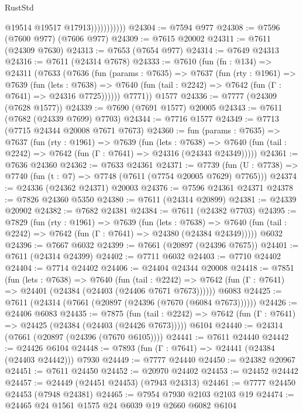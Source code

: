 \begin{lexlean}{RustStd}
\begin{coremodule}
{\begin{coremodule}
{{{{{{{{{{{{{{{{{{{{{{{{{{{{{{{{{{                          @19514
                          @19517
                          @17913)))))))))))
@24304 := @7594 @977
@24308 := @7596 (@7600 @977) (@7606 @977)
@24309 := @7615 @20002
@24311 := @7611 (@24309 @7630)
@24313 := @7653 (@7654 @977)
@24314 := @7649 @24313
@24316 := @7611 (@24314 @7678)
@24333 := @7610
    (fun (fn : @134) =>
    @24311
      (@7633
        (@7636
          (fun (params : @7635) =>
          @7637
            (fun (rty : @1961) =>
            @7639
              (fun (lets : @7638) =>
              @7640 (fun (tail : @2242) => @7642 (fun (Γ : @7641) => @24316 @7725))))))
        @7771))
    @1577
@24336 := @7777 (@24309 (@7628 @1577))
@24339 := @7690 (@7691 @1577) @20005
@24343 := @7611 (@7682 (@24339 @7699) @7703)
@24344 := @7716 @1577
@24349 := @7713 (@7715 @24344 @20008 @7671 @7673)
@24360 := fun (params : @7635) =>
  @7637
    (fun (rty : @1961) =>
    @7639
      (fun (lets : @7638) =>
      @7640 (fun (tail : @2242) => @7642 (fun (Γ : @7641) => @24316 (@24343 @24349)))))
@24361 := @7636 @24360
@24362 := @7633 @24361
@24371 := @7739
    (fun (U : @7738) => @7740 (fun (t : @7) => @7748 (@7611 (@7754 @20005 @7629) @7765)))
@24374 := @24336 (@24362 @24371) @20003
@24376 := @7596 @24361 @24371
@24378 := @7826 @24360 @5350
@24380 := @7611 (@24314 @20899)
@24381 := @24339 @20902
@24382 := @7682 @24381
@24384 := @7611 (@24382 @7703)
@24395 := @7829
    (fun (rty : @1961) =>
    @7639
      (fun (lets : @7638) =>
      @7640 (fun (tail : @2242) => @7642 (fun (Γ : @7641) => @24380 (@24384 @24349)))))
    @6032
@24396 := @7667 @6032
@24399 := @7661 (@20897 (@24396 @7675))
@24401 := @7611 (@24314 @24399)
@24402 := @7711 @6032
@24403 := @7710 @24402
@24404 := @7714 @24402
@24406 := @24404 @24344 @20008
@24418 := @7851
    (fun (lets : @7638) =>
    @7640
      (fun (tail : @2242) =>
      @7642 (fun (Γ : @7641) => @24401 (@24384 (@24403 (@24406 @7671 @7673))))))
    @6083
@24425 := @7611 (@24314 (@7661 (@20897 (@24396 (@7670 (@6084 @7673))))))
@24426 := @24406 @6083
@24435 := @7875
    (fun (tail : @2242) => @7642 (fun (Γ : @7641) => @24425 (@24384 (@24403 (@24426 @7673)))))
    @6104
@24440 := @24314 (@7661 (@20897 (@24396 (@7670 @6105))))
@24441 := @7611 @24440
@24442 := @24426 @6104
@24448 := @7893 (fun (Γ : @7641) => @24441 (@24384 (@24403 @24442))) @7930
@24449 := @7777 @24440
@24450 := @24382 @20967
@24451 := @7611 @24450
@24452 := @20970 @24402
@24453 := @24452 @24442
@24457 := @24449 (@24451 @24453) (@7943 @24313)
@24461 := @7777 @24450 @24453 (@7948 @24381)
@24465 := @7954 @7930 @2103 @2103 @19
@24474 := @24465 @24 @1561 @1575 @24 @6039 @19 @2660 @6082 @6104
}}}}}}}}}}}}}}}}}}}}}}}}}}}}}}}}}}
\end{coremodule}}
\end{coremodule}
\end{lexlean}
